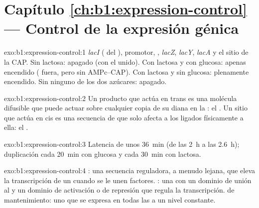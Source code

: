 \section*{Capítulo \ref{ch:b1:expression-control} --- Control de la expresión génica}

\begin{solution}{exo:b1:expression-control:1}
\emph{lacI} ( del ), promotor, , \emph{lacZ},
\emph{lacY}, \emph{lacA} y el sitio de la CAP. Sin lactosa: apagado (con el
 unido). Con lactosa y con glucosa: apenas encendido (
fuera, pero sin AMPc--CAP). Con lactosa y sin glucosa: plenamente encendido.
Sin ninguno de los dos azúcares: apagado.
\end{solution}

\begin{solution}{exo:b1:expression-control:2}
Un producto que actúa en trans es una molécula difusible que puede actuar
sobre cualquier copia de su diana en la : el . Un sitio que
actúa en cis es una secuencia de  que solo afecta a los  ligados
físicamente a ella: el .
\end{solution}

\begin{solution}{exo:b1:expression-control:3}
Latencia de unos \qty{36}{min} (de las \qty{2}{h} a las \qty{2.6}{h});
duplicación cada \qty{20}{min} con glucosa y cada \qty{30}{min} con
lactosa.
\end{solution}

\begin{solution}{exo:b1:expression-control:4}
: una secuencia reguladora, a menudo lejana, que eleva la
transcripción de un  cuando se le unen factores. :
una  con un dominio de unión al  y un dominio de activación o de
represión que regula la transcripción.  de mantenimiento: uno que se
expresa en todas las  a un nivel constante.
\end{solution}

